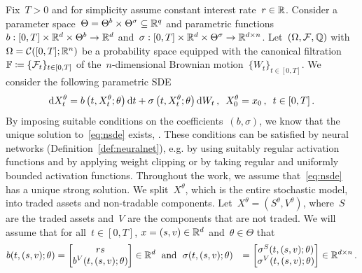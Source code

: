 Fix~$T>0$ and for simplicity assume constant interest rate~$r\in \mathbb{R}$. 
Consider a parameter space~$\Theta = \Theta^b\times \Theta^\sigma \subseteq \mathbb{R}^{q}$ and parametric functions~${b:[0,T]\times\mathbb{R}^d \times \Theta^b \rightarrow \mathbb{R}^{d}}$ and~${\sigma:[0,T]\times\mathbb{R}^d \times \Theta^\sigma \rightarrow \mathbb{R}^{d \times n}}$. Let~$(\Omega, \mathcal{F}, \mathbb{Q})$ with~$\Omega = \mathcal{C}([0,T];\mathbb{R}^n)$ be a probability space  equipped with the canonical filtration~$\mathbb{F}\coloneqq\{\mathcal{F}_t\}_{t\in[0,T]}$ of the~$n$-dimensional Brownian motion~$\{W_t\}_{t\in[0,T]}$. 
We consider the following parametric SDE
\begin{equation}\label{eq:nsde}
\mathrm{d} X^{\theta}_t= b\left(t,X_t^{\theta}; \theta\right) \mathrm{d} t + \sigma\left(t,X_t^\theta;\theta \right)\mathrm{d} W_t\,,\,\,\, X^\theta_0 = x_0\,,\,\,\, t \in [0,T]\,.
\end{equation}
 By imposing suitable conditions on the coefficients~$(b,\sigma)$, we know that the unique solution to~\eqref{eq:nsde} exists, \cite[Chapter 2]{Krylov1980ControlledProcesses}. 
These conditions can be satisfied by neural networks (Definition~\ref{def:neuralnet}), e.g. by using suitably regular activation functions and by applying weight clipping or by taking regular and uniformly bounded activation functions. Throughout the work, we assume that~\eqref{eq:nsde} has a unique strong solution.
We split~$X^\theta$, which is the entire stochastic model, into traded assets and non-tradable components. 
Let~$X^\theta=(S^\theta, V^\theta)$, where~$S$ are the traded assets and~$V$ are the components that are not traded. 
We will assume that for all~$t\in[0,T]$, $x=(s, v)\in\nobreak\mathbb{R}^d$ and~$\theta \in \Theta$ that
\begin{align*}
b(t, (s,v); \theta) &= 
\begin{bmatrix}
rs \\ b^V(t,(s,v);\theta)
\end{bmatrix}\in\mathbb{R}^d \;\textup{ and }\;
\sigma(t,(s,v);\theta) &= \begin{bmatrix}\sigma^S(t,(s,v);\theta) \\ \sigma^V(t,(s,v);\theta)\end{bmatrix}\in\mathbb{R}^{d\times n}\,.
\end{align*}
